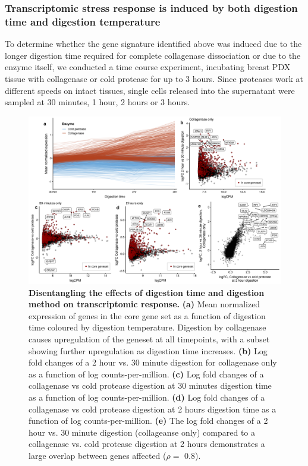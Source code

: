 \subsubsection{Transcriptomic stress response is induced by both digestion time and digestion temperature}
To determine whether the gene signature identified above was induced due to the longer digestion time required for complete collagenase dissociation or due to the enzyme itself, we conducted a time course experiment, incubating breast PDX tissue with collagenase or cold protease for up to 3 hours. Since proteases work at different speeds on intact tissues, single cells released into the supernatant were sampled at 30 minutes, 1 hour, 2 hours or 3 hours.   


\begin{figure}
	\centering
	\includegraphics[width=\textwidth]{Figures/digestiontime.png}
	\caption[Differential expression of cluster 1 of live, dead, and dying cells.]
	{\small
	 \textbf{Disentangling the effects of digestion time and digestion method on transcriptomic response.}
    \textbf{(a)} Mean normalized expression of genes in the core gene set as a function of digestion time coloured by digestion temperature. Digestion by collagenase causes upregulation of the geneset at all timepoints, with a subset showing further upregulation as digestion time increases.
    \textbf{(b)} Log fold changes of a 2 hour vs. 30 minute digestion for collagenase only as a function of log counts-per-million. 
    \textbf{(c)} Log fold changes of a collagenase vs cold protease digestion at 30 minutes digestion time as a function of log counts-per-million. 
    \textbf{(d)} Log fold changes of a collagenase vs cold protease digestion at 2 hours digestion time as a function of log counts-per-million. 
    \textbf{(e)} The log fold changes of a 2 hour vs. 30 minute digestion (collageanse only) compared to a collagenase vs. cold protease digestion at 2 hours demonstrates a large overlap between genes affected ($\rho=$ 0.8).
    }
    \label{fig:digestiontime}
\end{figure}



